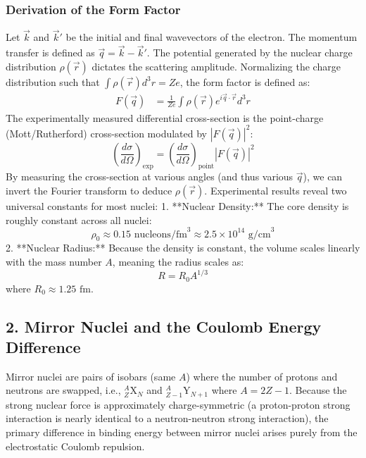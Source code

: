 \subsubsection*{Derivation of the Form Factor}
Let $\vec{k}$ and $\vec{k}'$ be the initial and final wavevectors of the electron. The momentum transfer is defined as $\vec{q} = \vec{k} - \vec{k}'$. 
The potential generated by the nuclear charge distribution $\rho(\vec{r})$ dictates the scattering amplitude. Normalizing the charge distribution such that $\int \rho(\vec{r}) d^3r = Ze$, the form factor is defined as:
\begin{align*}
F(\vec{q}) &= \frac{1}{Ze} \int \rho(\vec{r}) e^{i \vec{q} \cdot \vec{r}} d^3r
\end{align*}
The experimentally measured differential cross-section is the point-charge (Mott/Rutherford) cross-section modulated by $|F(\vec{q})|^2$:
\begin{equation}
    \left( \frac{d\sigma}{d\Omega} \right)_{\text{exp}} = \left( \frac{d\sigma}{d\Omega} \right)_{\text{point}} \left| F(\vec{q}) \right|^2
    \label{eq:lec02:cross_section}
\end{equation}
By measuring the cross-section at various angles (and thus various $\vec{q}$), we can invert the Fourier transform to deduce $\rho(\vec{r})$. 
Experimental results reveal two universal constants for most nuclei:
1.  **Nuclear Density:** The core density is roughly constant across all nuclei:
    \begin{equation}\boxed{
        \rho_0 \approx 0.15 \text{ nucleons/fm}^3 \approx 2.5 \times 10^{14} \text{ g/cm}^3
        \label{eq:lec02:nuclear_density}
    }\end{equation}
2.  **Nuclear Radius:** Because the density is constant, the volume scales linearly with the mass number $A$, meaning the radius scales as:
    \begin{equation}\boxed{
        R = R_0 A^{1/3}
        \label{eq:lec02:nuclear_radius}
    }\end{equation}
    where $R_0 \approx 1.25 \text{ fm}$.

\subsection*{2. Mirror Nuclei and the Coulomb Energy Difference}
Mirror nuclei are pairs of isobars (same $A$) where the number of protons and neutrons are swapped, i.e., $^{A}_{Z}\text{X}_{N}$ and $^{A}_{Z-1}\text{Y}_{N+1}$ where $A = 2Z - 1$.
Because the strong nuclear force is approximately charge-symmetric (a proton-proton strong interaction is nearly identical to a neutron-neutron strong interaction), the primary difference in binding energy between mirror nuclei arises purely from the electrostatic Coulomb repulsion.

